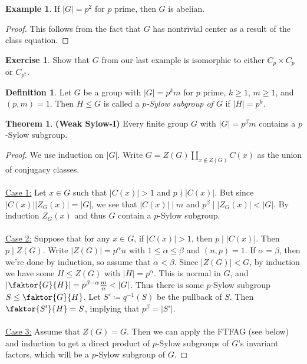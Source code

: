 \documentclass[10pt,letterpaper,cm]{nupset}
\theoremstyle{definition}
\newtheorem*{definition}{Definition}
\newtheorem{exmp}{Example}
\newtheorem{theorem}{Theorem}
\newtheorem{exercise}{Exercise}
\newcommand{\1}{\mathbf{1}}
\newcommand{\0}{\vec 0}
\begin{document}
\begin{exmp}
If $|G| =p^2$ for $p$ prime, then $G$ is abelian.
\end{exmp}
\begin{proof}
This follows from the fact that $G$ has nontrivial center as a result of the class equation.
\end{proof}

\begin{exercise}
Show that $G$ from our last example is isomorphic to either $C_p \times C_p$ or $C_{p^2}$.
\end{exercise}

\begin{definition}
Let $G$ be a group with $|G|= p^km$ for $p$ prime, $k\geq 1$, $m\geq 1$, and $(p,m) =1$. Then $H \leq G$ is called a \textit{$p$-Sylow subgroup of $G$} if $|H| = p^k$.
\end{definition}

\begin{theorem}{\textbf{(Weak Sylow-I)}}
Every finite group $G$ with $|G| = p^{\beta}m$ contains a $p$-Sylow subgroup.
\end{theorem}
\begin{proof}
We use induction on $|G|$. Write $G= Z(G) \coprod_{x\notin Z(G)} C(x)$ as the union of conjugacy classes. \\ \\ \underline{Case 1:} Let $x\in G$ such that $|C(x)|>1$ and $p\nmid |C(x)|$. But since $|C(x)||Z_G(x)| =|G|$, we see that $|C(x)| \mid m$ and $p^{\beta}\mid |Z_G(x)|< |G|$. By induction $Z_G(x)$ and thus $G$ contain a $p$-Sylow subgroup.
\\ \\ \underline{Case 2:}
 Suppose that for any $x\in G$, if $|C(x)| >1$, then $p\mid |C(x)|$. Then $p\mid Z(G)$. Write $|Z(G)| = p^{\alpha}n$ with $1\leq \alpha\leq \beta$ and $(n, p)=1$. If $\alpha = \beta$, then we're done by induction, so assume that $\alpha <
 \beta$. Since $|Z(G)| < G$, by induction we have some $H\leq Z(G)$ with $|H| = p^{\alpha}$. This is normal in $G$, and $|\faktor{G}{H}| = p^{\beta - \alpha}\frac{m}{n} < |G|$. Thus there is some $p$-Sylow subgroup $S\leq \faktor{G}{H}$.  Let $S'\coloneqq q^{-1}(S)$ be the pullback of $S$.  Then $\faktor{S'}{H} =S$, implying that $p^{\beta}= |S'|$. 
\\ \\ \underline{Case 3:} Assume that $Z(G) = G$. Then we can apply the FTFAG (see below) and induction to get a direct product of $p$-Sylow subgroups of $G$'s invariant factors, which will be a $p$-Sylow subgroup of $G$. 
\end{proof}
\end{document}
